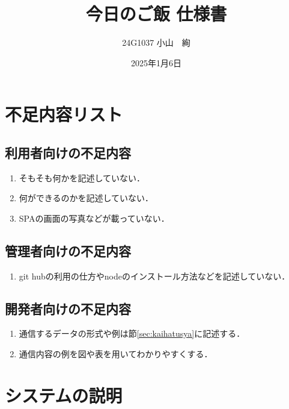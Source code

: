 \documentclass[uplatex,dvipdfmx]{jsarticle}
\begin{document}
\title{今日のご飯 仕様書} %
\author{24G1037 小山　絢}
\date{2025年1月6日}
\maketitle
\section{不足内容リスト}
\subsection{利用者向けの不足内容}
\begin{enumerate}
    \item そもそも何かを記述していない．
    \item 何ができるのかを記述していない．
    \item SPAの画面の写真などが載っていない．
\end{enumerate}
\subsection{管理者向けの不足内容}
\begin{enumerate}
    \item git hubの利用の仕方やnodeのインストール方法などを記述していない．
\end{enumerate}
\subsection{開発者向けの不足内容}
\begin{enumerate}
    \item 通信するデータの形式や例は節\ref{sec:kaihatusya}に記述する．
    \item 通信内容の例を図や表を用いてわかりやすくする．
\end{enumerate}
\section{システムの説明}
\end{document}
